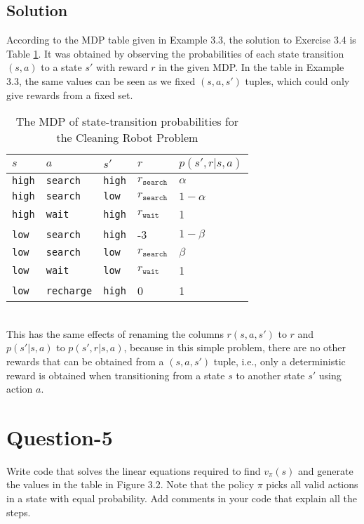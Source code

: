 \documentclass[11pt]{article}
\begin{document}
    \subsection*{Solution}
    According to the MDP table given in Example 3.3, the solution to Exercise 3.4 is Table
    \ref{tab:mdp-cleaning-robot}. It was obtained by observing the probabilities of each state transition
    $(s, a)$ to a state $s'$ with reward $r$ in the given MDP. In the table in Example 3.3, the same
    values can be seen as we fixed $(s, a, s')$ tuples, which could only give rewards from a fixed set.
    \begin{table}[ht]
        \centering
        \renewcommand{\arraystretch}{1.25}
        \begin{tabular}{llll|l}
            $s$ & $a$ & $s'$ & $r$ & $p(s', r | s, a)$ \\
            \hline
            \texttt{high} & \texttt{search} & \texttt{high} & $r_{\texttt{search}}$ & $\alpha$  \\
            \texttt{high} & \texttt{search} & \texttt{low} & $r_{\texttt{search}}$ & $1 - \alpha$ \\
            \texttt{high} & \texttt{wait} & \texttt{high} & $r_{\texttt{wait}}$ & 1 \\
            \texttt{low} & \texttt{search} & \texttt{high} & -3 & $1 - \beta$ \\
            \texttt{low} & \texttt{search} & \texttt{low} & $r_{\texttt{search}}$ & $\beta$ \\
            \texttt{low} & \texttt{wait} & \texttt{low} & $r_{\texttt{wait}}$ & 1 \\
            \texttt{low} & \texttt{recharge} & \texttt{high} & 0 & 1 \\
        \end{tabular}
        \caption{The MDP of state-transition probabilities for the Cleaning Robot Problem}
        \label{tab:mdp-cleaning-robot}
    \end{table}
    \vspace*{0pt} \\
    This has the same effects of renaming the columns $r(s, a, s')$ to $r$ and $p(s' | s, a)$ to
    $p(s', r | s, a)$, because in this simple problem, there are no other rewards that can
    be obtained from a $(s, a, s')$ tuple, i.e., only a deterministic reward is obtained when
    transitioning from a state $s$ to another state $s'$ using action $a$.

    \section*{Question-5}
    Write code that solves the linear equations required to find $v_{\pi}(s)$ and generate the values in
    the table in Figure 3.2. Note that the policy $\pi$ picks all valid actions in a state with equal
    probability. Add comments in your code that explain all the steps.
\end{document}
